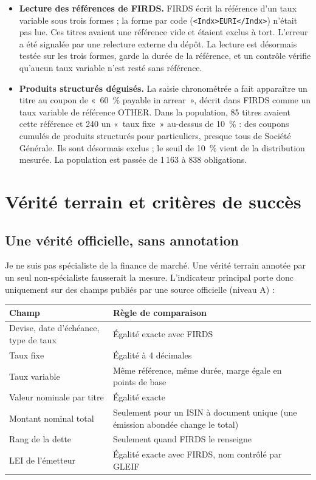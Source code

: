 \documentclass[11pt,a4paper]{article}
\begin{document}
\begin{itemize}
  \item \textbf{Lecture des références de FIRDS.} FIRDS écrit la référence d'un taux variable sous trois formes ; la forme par code (\texttt{<Indx>EURI</Indx>}) n'était pas lue. Ces titres avaient une référence vide et étaient exclus à tort. L'erreur a été signalée par une relecture externe du dépôt. La lecture est désormais testée sur les trois formes, garde la durée de la référence, et un contrôle vérifie qu'aucun taux variable n'est resté sans référence.
  \item \textbf{Produits structurés déguisés.} La saisie chronométrée a fait apparaître un titre au coupon de «~60~\% payable in arrear~», décrit dans FIRDS comme un taux variable de référence OTHER. Dans la population, 85 titres avaient cette référence et 240 un «~taux fixe~» au-dessus de 10~\% : des coupons cumulés de produits structurés pour particuliers, presque tous de Société Générale. Ils sont désormais exclus ; le seuil de 10~\% vient de la distribution mesurée. La population est passée de 1\,163 à 838 obligations.
\end{itemize}


\section{Vérité terrain et critères de succès}

\subsection{Une vérité officielle, sans annotation}

Je ne suis pas spécialiste de la finance de marché. Une vérité terrain annotée par un seul non-spécialiste fausserait la mesure. L'indicateur principal porte donc uniquement sur des champs publiés par une source officielle (niveau A) :

\begin{table}[H]
\small
\begin{tabularx}{\linewidth}{lY}
\toprule
\textbf{Champ} & \textbf{Règle de comparaison} \\
\midrule
Devise, date d'échéance, type de taux & Égalité exacte avec FIRDS \\
Taux fixe & Égalité à 4 décimales \\
Taux variable & Même référence, même durée, marge égale en points de base \\
Valeur nominale par titre & Égalité exacte \\
Montant nominal total & Seulement pour un ISIN à document unique (une émission abondée change le total) \\
Rang de la dette & Seulement quand FIRDS le renseigne \\
LEI de l'émetteur & Égalité exacte avec FIRDS, nom contrôlé par GLEIF \\
\bottomrule
\end{tabularx}
\end{table}
\end{document}
